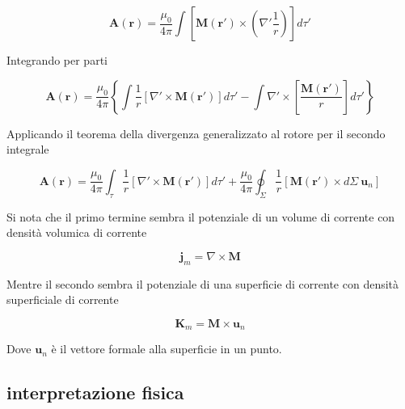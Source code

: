 \begin{equation*}
    \mathbf{A} (\mathbf{r}) = \frac{\mu_0}{4 \pi} \int \left[ \mathbf{M}(\mathbf{r}') \times \left( \nabla ' \frac{1}{r} \right) \right] d \tau'
\end{equation*}

Integrando per parti 

\begin{equation*}
    \mathbf{A} (\mathbf{r}) = \frac{\mu_0}{4\pi} \left\{ \int \frac{1}{r}[\nabla' \times \mathbf{M} (\mathbf{r'})] d \tau' - \int \nabla' \times \left[ \frac{\mathbf{M} (\mathbf{r'})}{r} \right] d \tau' \right\}
\end{equation*}

Applicando il teorema della divergenza generalizzato al rotore per il secondo integrale 

\begin{equation*}
    \mathbf{A} (\mathbf{r}) = \frac{\mu_0}{4\pi} \int_{\tau}\frac{1}{r} [\nabla' \times \mathbf{M}(\mathbf{r'})] d \tau' + \frac{\mu_0}{4\pi} \oint_{\Sigma} \frac{1}{r} [\mathbf{M}(\mathbf{r'}) \times d \Sigma \  \mathbf{u}_n ] 
\end{equation*}

Si nota che il primo termine sembra il potenziale di un volume di corrente con densità volumica di corrente 

\begin{tcolorbox}[colback=yellow!10!white, colframe=orange!70!black, boxrule=0.8pt]
\begin{equation}
    \mathbf{j}_m = \nabla \times \mathbf{M}
\end{equation}
\end{tcolorbox}

Mentre il secondo sembra il potenziale di una superficie  di corrente con densità superficiale di corrente 

\begin{tcolorbox}[colback=yellow!10!white, colframe=orange!70!black, boxrule=0.8pt]
\begin{equation}
    \mathbf{K}_m = \mathbf{M} \times \mathbf{u}_n
\end{equation}
\end{tcolorbox}

Dove $\mathbf{u}_n$ è il vettore formale alla superficie in un punto. 

\newpage

\subsection{interpretazione fisica}

